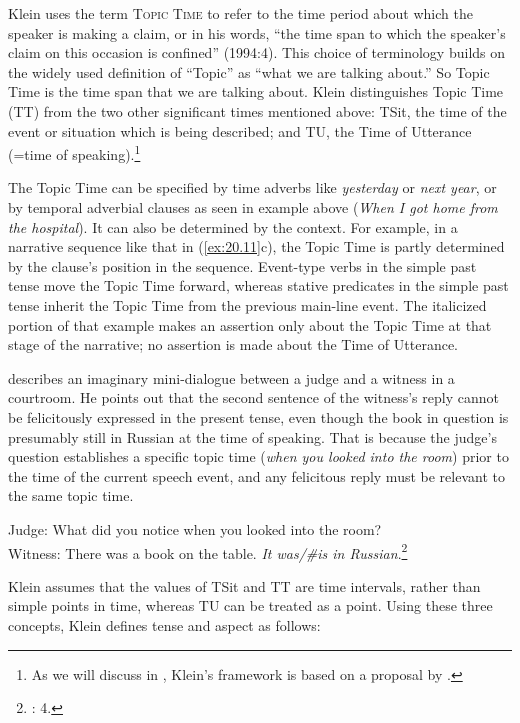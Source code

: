 Klein uses the term \textsc{Topic Time} to refer to the time period about which the speaker is making a claim, or in his words, “the time span to which the speaker’s claim on this occasion is confined” (1994:4). This choice of terminology builds on the widely used definition of “Topic” as “what we are talking about.” So Topic Time is the time span that we are talking about. Klein distinguishes Topic Time (TT) from the two other significant times mentioned above: TSit, the time of the event or situation which is being described; and TU, the Time of Utterance (=time of speaking).\footnote{As we will discuss in , Klein’s framework is based on a proposal by \citet[§51]{Reichenbach1947}.}



The Topic Time can be specified by time adverbs like \textit{yesterday} or \textit{next year}, or by temporal adverbial clauses as seen in example  above (\textit{When I got home from the hospital}). It can also be determined by the context. For example, in a narrative sequence like that in (\ref{ex:20.11}c), the Topic Time is partly determined by the clause’s position in the sequence. Event-type verbs in the simple past tense move the Topic Time forward, whereas stative predicates in the simple past tense inherit the Topic Time from the previous main-line event. The italicized portion of that example makes an assertion only about the Topic Time at that stage of the narrative; no assertion is made about the Time of Utterance.



\citet[4]{Klein1994} describes an imaginary mini-dialogue between a judge and a witness in a courtroom. He points out that the second sentence of the witness’s reply cannot be felicitously expressed in the present tense, even though the book in question is presumably still in {Russian} at the time of speaking. That is because the judge’s question establishes a specific topic time (\textit{when you looked into the room}) prior to the time of the current speech event, and any felicitous reply must be relevant to the same topic time.


\ea \label{ex:20.12}
Judge: What did you notice when you looked into the room?\\
Witness: There was a book on the table. \textit{It was/\#is in Russian}.\footnote{\citealt{Klein1994}: 4.}
\z


Klein assumes that the values of TSit and TT are time intervals, rather than simple points in time, whereas TU can be treated as a point. Using these three concepts, Klein defines tense and aspect as follows:
\largerpage

